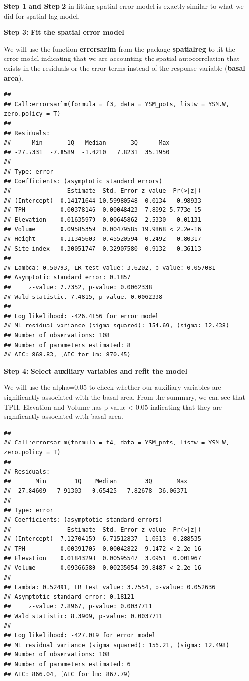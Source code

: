 \documentclass[
]{book}
\begin{document}
\textbf{Step 1 and Step 2} in fitting spatial error model is exactly similar to what we did for spatial lag model.

\textbf{Step 3: Fit the spatial error model}

We will use the function \textbf{errorsarlm} from the package \textbf{spatialreg} to fit the error model indicating that we are accounting the spatial autocorrelation that exists in the residuals or the error terms instead of the response variable (\textbf{basal area}).

\begin{verbatim}
## 
## Call:errorsarlm(formula = f3, data = YSM_pots, listw = YSM.W, zero.policy = T)
## 
## Residuals:
##      Min       1Q   Median       3Q      Max 
## -27.7331  -7.8589  -1.0210   7.8231  35.1950 
## 
## Type: error 
## Coefficients: (asymptotic standard errors) 
##                Estimate  Std. Error z value  Pr(>|z|)
## (Intercept) -0.14171644 10.59980548 -0.0134   0.98933
## TPH          0.00378146  0.00048423  7.8092 5.773e-15
## Elevation    0.01635979  0.00645862  2.5330   0.01131
## Volume       0.09585359  0.00479585 19.9868 < 2.2e-16
## Height      -0.11345603  0.45520594 -0.2492   0.80317
## Site_index  -0.30051747  0.32907580 -0.9132   0.36113
## 
## Lambda: 0.50793, LR test value: 3.6202, p-value: 0.057081
## Asymptotic standard error: 0.1857
##     z-value: 2.7352, p-value: 0.0062338
## Wald statistic: 7.4815, p-value: 0.0062338
## 
## Log likelihood: -426.4156 for error model
## ML residual variance (sigma squared): 154.69, (sigma: 12.438)
## Number of observations: 108 
## Number of parameters estimated: 8 
## AIC: 868.83, (AIC for lm: 870.45)
\end{verbatim}

\textbf{Step 4: Select auxiliary variables and refit the model}

We will use the alpha=0.05 to check whether our auxiliary variables are significantly associated with the basal area. From the summary, we can see that TPH, Elevation and Volume has p-value \textless{} 0.05 indicating that they are significantly associated with basal area.

\begin{verbatim}
## 
## Call:errorsarlm(formula = f4, data = YSM_pots, listw = YSM.W, zero.policy = T)
## 
## Residuals:
##       Min        1Q    Median        3Q       Max 
## -27.84609  -7.91303  -0.65425   7.82678  36.06371 
## 
## Type: error 
## Coefficients: (asymptotic standard errors) 
##                Estimate  Std. Error z value  Pr(>|z|)
## (Intercept) -7.12704159  6.71512837 -1.0613  0.288535
## TPH          0.00391705  0.00042822  9.1472 < 2.2e-16
## Elevation    0.01843298  0.00595547  3.0951  0.001967
## Volume       0.09366580  0.00235054 39.8487 < 2.2e-16
## 
## Lambda: 0.52491, LR test value: 3.7554, p-value: 0.052636
## Asymptotic standard error: 0.18121
##     z-value: 2.8967, p-value: 0.0037711
## Wald statistic: 8.3909, p-value: 0.0037711
## 
## Log likelihood: -427.019 for error model
## ML residual variance (sigma squared): 156.21, (sigma: 12.498)
## Number of observations: 108 
## Number of parameters estimated: 6 
## AIC: 866.04, (AIC for lm: 867.79)
\end{verbatim}
\end{document}
